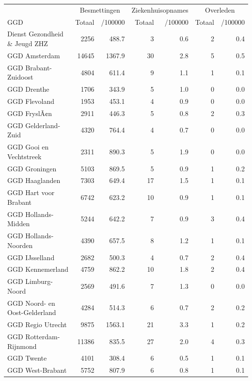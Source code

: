 \documentclass[
  english,
  man,floatsintext]{apa6}
\begin{document}
\begin{table}
\centering\begingroup\fontsize{10}{12}\selectfont

\begin{threeparttable}
\begin{tabular}{lrrrrrr}
\toprule
\multicolumn{1}{c}{ } & \multicolumn{2}{c}{Besmettingen} & \multicolumn{2}{c}{Ziekenhuisopnames} & \multicolumn{2}{c}{Overleden} \\
\cmidrule(l{3pt}r{3pt}){2-3} \cmidrule(l{3pt}r{3pt}){4-5} \cmidrule(l{3pt}r{3pt}){6-7}
GGD & Totaal & /100000 & Totaal & /100000 & Totaal & /100000\\
\midrule
Dienst Gezondheid \& Jeugd ZHZ & 2256 & 488.7 & 3 & 0.6 & 2 & 0.4\\
GGD Amsterdam & 14645 & 1367.9 & 30 & 2.8 & 5 & 0.5\\
GGD Brabant-Zuidoost & 4804 & 611.4 & 9 & 1.1 & 1 & 0.1\\
GGD Drenthe & 1706 & 343.9 & 5 & 1.0 & 0 & 0.0\\
GGD Flevoland & 1953 & 453.1 & 4 & 0.9 & 0 & 0.0\\
GGD FryslÃ¢n & 2911 & 446.3 & 5 & 0.8 & 2 & 0.3\\
GGD Gelderland-Zuid & 4320 & 764.4 & 4 & 0.7 & 0 & 0.0\\
GGD Gooi en Vechtstreek & 2311 & 890.3 & 5 & 1.9 & 0 & 0.0\\
GGD Groningen & 5103 & 869.5 & 5 & 0.9 & 1 & 0.2\\
GGD Haaglanden & 7303 & 649.4 & 17 & 1.5 & 1 & 0.1\\
GGD Hart voor Brabant & 6742 & 623.2 & 10 & 0.9 & 1 & 0.1\\
GGD Hollands-Midden & 5244 & 642.2 & 7 & 0.9 & 3 & 0.4\\
GGD Hollands-Noorden & 4390 & 657.5 & 8 & 1.2 & 1 & 0.1\\
GGD IJsselland & 2682 & 500.3 & 4 & 0.7 & 2 & 0.4\\
GGD Kennemerland & 4759 & 862.2 & 10 & 1.8 & 2 & 0.4\\
GGD Limburg-Noord & 2569 & 491.6 & 7 & 1.3 & 0 & 0.0\\
GGD Noord- en Oost-Gelderland & 4284 & 514.3 & 6 & 0.7 & 2 & 0.2\\
GGD Regio Utrecht & 9875 & 1563.1 & 21 & 3.3 & 1 & 0.2\\
GGD Rotterdam-Rijnmond & 11386 & 835.5 & 27 & 2.0 & 4 & 0.3\\
GGD Twente & 4101 & 308.4 & 6 & 0.5 & 1 & 0.1\\
GGD West-Brabant & 5752 & 807.9 & 6 & 0.8 & 1 & 0.1\\

\end{tabular}
\end{threeparttable}
\end{table}
\end{document}

